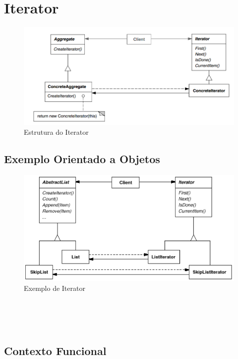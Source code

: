\section{Iterator}

\begin{figure}[htb]
	\caption{\label{iterator_struct}Estrutura do Iterator}
	\begin{center}
	    \includegraphics[scale=0.5]{5_padroes-contexto-funcional/5.3_comportamentais/5.3.04_iterator/diagram.png}
	\end{center}
\end{figure}

\subsection*{Exemplo Orientado a Objetos}

\begin{figure}[htb]
	\caption{\label{iterator_exemplo}Exemplo de Iterator}
	\begin{center}
	    \includegraphics[scale=0.5]{5_padroes-contexto-funcional/5.3_comportamentais/5.3.04_iterator/iterator_exemplo.png}
	\end{center}
\end{figure}

\begin{lstlisting}[caption={Iterator Orientação a Objetos},label=ooiterator]


    
\end{lstlisting}

\subsection*{Contexto Funcional}


\begin{lstlisting}[caption={Iterator Funcional},label=fpiterator]
    

    
\end{lstlisting}